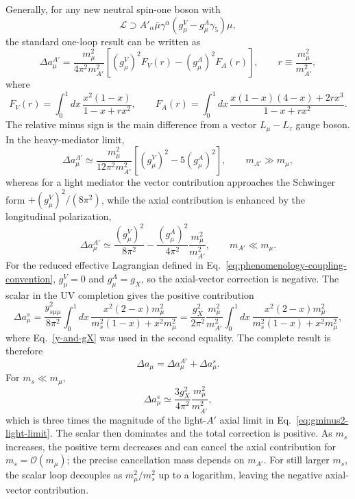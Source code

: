 \documentclass[onecolumn, aps, nofootinbib, prd, preprint, floats, floatfix, amsmath, amssymb, superscriptaddress, preprintnumbers]{revtex4-2}
\begin{document}
Generally, for any new neutral spin-one boson with
\begin{equation}
\mathcal L\supset
A'_\alpha\bar\mu\gamma^\alpha
\left(g_\mu^V-g_\mu^A\gamma_5\right)\mu ,
\end{equation}
the standard one-loop result can be written as \cite{Leveille:1977rc,Davoudiasl:2014kua,Anastasopoulos:2022ywj}
\begin{equation}
\Delta a_\mu^{A'}=
\frac{m_\mu^2}{4\pi^2m_{A'}^2}
\left[
(g_\mu^V)^2F_V(r)
-(g_\mu^A)^2F_A(r)
\right],
\qquad
r\equiv \frac{m_\mu^2}{m_{A'}^2},
\label{eq:gminus2-vector-axial}
\end{equation}
where
\begin{equation}
F_V(r)=\int_0^1 dx\,
\frac{x^2(1-x)}{1-x+r x^2},
\qquad
F_A(r)=\int_0^1 dx\,
\frac{x(1-x)(4-x)+2r x^3}{1-x+r x^2}.
\label{eq:gminus2-FV-FA}
\end{equation}
The relative minus sign is the main difference from a vector $L_\mu-L_\tau$ gauge boson. In the heavy-mediator limit,
\begin{equation}
\Delta a_\mu^{A'}\simeq
\frac{m_\mu^2}{12\pi^2m_{A'}^2}
\left[(g_\mu^V)^2-5(g_\mu^A)^2\right],
\qquad m_{A'}\gg m_\mu ,
\label{eq:gminus2-heavy-limit}
\end{equation}
whereas for a light mediator the vector contribution approaches the Schwinger form $+(g_\mu^V)^2/(8\pi^2)$, while the axial contribution is enhanced by the longitudinal polarization,
\begin{equation}
\Delta a_\mu^{A'}\simeq
\frac{(g_\mu^V)^2}{8\pi^2}
-\frac{(g_\mu^A)^2}{4\pi^2}\frac{m_\mu^2}{m_{A'}^2},
\qquad m_{A'}\ll m_\mu .
\label{eq:gminus2-light-limit}
\end{equation}
For the reduced effective Lagrangian defined in Eq.~\eqref{eq:phenomenology-coupling-convention}, $g_\mu^V=0$ and $g_\mu^A=g_X$, so the axial-vector correction is negative. The scalar in the UV completion gives the positive contribution~\cite{Leveille:1977rc,Tucker-Smith:2010wdq}
\begin{equation}
\Delta a_\mu^s=
\frac{y_{s\mu\mu}^2}{8\pi^2}
\int_0^1dx\,
\frac{x^2(2-x)m_\mu^2}
{m_s^2(1-x)+x^2m_\mu^2}
=\frac{g_X^2}{2\pi^2}\frac{m_\mu^2}{m_{A'}^2}
\int_0^1dx\,
\frac{x^2(2-x)m_\mu^2}
{m_s^2(1-x)+x^2m_\mu^2},
\label{eq:gminus2-scalar}
\end{equation}
where Eq.~\eqref{y-and-gX} was used in the second equality. The complete result is therefore
\begin{equation}
\Delta a_\mu=\Delta a_\mu^{A'}+\Delta a_\mu^s.
\label{eq:gminus2-total}
\end{equation}
For $m_s\ll m_\mu$,
\begin{equation}
\Delta a_\mu^s\simeq
\frac{3g_X^2}{4\pi^2}\frac{m_\mu^2}{m_{A'}^2},
\end{equation}
which is three times the magnitude of the light-$A'$ axial limit in Eq.~\eqref{eq:gminus2-light-limit}. The scalar then dominates and the total correction is positive. As $m_s$ increases, the positive term decreases and can cancel the axial contribution for $m_s=\mathcal O(m_\mu)$; the precise cancellation mass depends on $m_{A'}$. For still larger $m_s$, the scalar loop decouples as $m_\mu^2/m_s^2$ up to a logarithm, leaving the negative axial-vector contribution.
\end{document}
